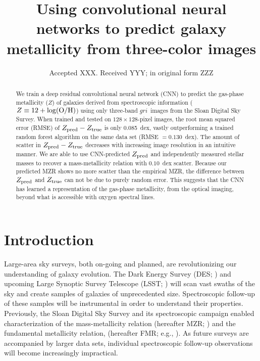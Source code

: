 \documentclass[fleqn,usenatbib]{mnras}
\title[Galaxy metallicity with CNNs]{Using convolutional neural networks to predict galaxy metallicity from three-color images}
\author[Wu and Boada]
{\parbox{\textwidth}{John~F.~Wu$^{1}$\thanks{E-mail: \href{mailto:jw740@physics.rutgers.edu}} and
Steven~Boada$^{1}$}\vspace{0.4cm}\
\\
\parbox{\textwidth}{$^{1}$Department of Physics and Astronomy, Rutgers, The State University of New Jersey, 136 Frelinghuysen Road, Piscataway, NJ 08854-8019, USA\\}}
\date{Accepted XXX. Received YYY; in original form ZZZ}
\newcommand{\sdssg}{\hbox{$g$}}
\newcommand{\sdssr}{\hbox{$r$}}
\newcommand{\sdssi}{\hbox{$i$}}
\newcommand{\eg}{e.g.}
\begin{document}
\label{firstpage}
\pagerange{\pageref{firstpage}--\pageref{lastpage}}
\maketitle

\begin{abstract}
We train a deep residual convolutional neural network (CNN) to predict the gas-phase metallicity ($Z$) of galaxies derived from spectroscopic information ($Z \equiv 12 + \log(\rm O/H)$) using only three-band \sdssg\sdssr\sdssi\ images from the Sloan Digital Sky Survey. When trained and tested on $128 \times 128$-pixel images, the root mean squared error (RMSE) of $Z_{\rm pred} - Z_{\rm true}$ is only 0.085~dex, vastly outperforming a trained random forest algorithm on the same data set (RMSE $=0.130$~dex). The amount of scatter in $Z_{\rm pred} - Z_{\rm true}$ decreases with increasing image resolution in an intuitive manner. We are able to use CNN-predicted $Z_{\rm pred}$ and independently measured stellar masses to recover a mass-metallicity relation with $0.10$~dex scatter. Because our predicted MZR shows no more scatter than the empirical MZR, the difference between $Z_{\rm pred}$ and $Z_{\rm true}$ can not be due to purely random error. This suggests that the CNN has learned a representation of the gas-phase metallicity, from the optical imaging, beyond what is accessible with oxygen spectral lines.
\end{abstract}

\section{Introduction}\label{sec:introduction}
Large-area sky surveys, both on-going and planned, are revolutionizing our understanding of galaxy evolution. The Dark Energy Survey (DES; \citealt{DES2005}) and upcoming Large Synoptic Survey Telescope (LSST; \citealt{LSST2012}) will scan vast swaths of the sky and create samples of galaxies of unprecedented size. Spectroscopic follow-up of these samples will be instrumental in order to understand their properties. Previously, the Sloan Digital Sky Survey \citep[SDSS;][]{York2000} and its spectroscopic campaign enabled characterization of the mass-metallicity relation (hereafter MZR; \citealt{Tremonti2004}) and the fundamental metallicity relation, (hereafter FMR; \eg, \citealt{Mannucci2010}). As future surveys are accompanied by larger data sets, individual spectroscopic follow-up observations will become increasingly impractical.
\end{document}
